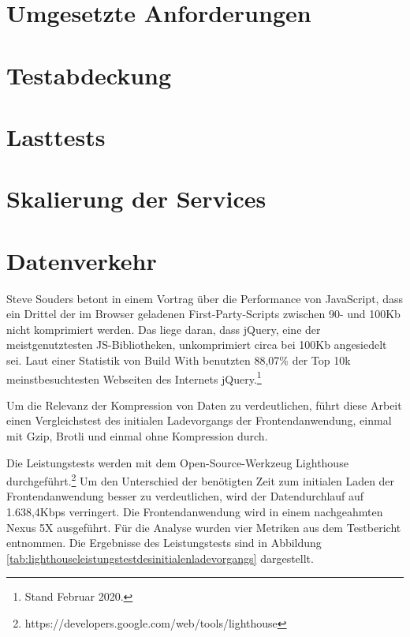 \section{Umgesetzte Anforderungen}
\label{sec:umgesetzteanforderungen}

\section{Testabdeckung}
\label{sec:testabdeckung}

\section{Lasttests}
\label{sec:lasttests}

\section{Skalierung der Services}
\label{sec:skalierungderservices}

\section{Datenverkehr}
\label{sec:uebertragung}

Steve Souders betont
in einem Vortrag über die Performance von JavaScript, dass ein Drittel der im Browser
geladenen First-Party-Scripts zwischen 90- und 100Kb nicht komprimiert werden.
Das liege daran, dass jQuery, eine der meistgenutztesten JS-Bibliotheken,
unkomprimiert circa bei 100Kb angesiedelt sei.\cite{SteveSoudersMakeJavaScriptFaster}
Laut einer Statistik von Build With benutzten 88,07\% der Top 10k meinstbesuchtesten
Webseiten des Internets jQuery.\footnote{Stand Februar 2020.\cite{BuildWithjQuery}}

Um die Relevanz der Kompression von Daten zu verdeutlichen, führt diese Arbeit einen
Vergleichstest des initialen Ladevorgangs der Frontendanwendung,
einmal mit Gzip, Brotli und einmal ohne Kompression durch.

Die Leistungstests
werden mit dem Open-Source-Werkzeug Lighthouse durchgeführt.\footnote{https://developers.google.com/web/tools/lighthouse}
Um den Unterschied der benötigten Zeit zum initialen Laden der Frontendanwendung
besser zu verdeutlichen, wird der Datendurchlauf auf 1.638,4Kbps verringert.
Die Frontendanwendung wird in einem nachgeahmten Nexus 5X ausgeführt.
Für die Analyse wurden vier Metriken aus dem Testbericht entnommen.
Die Ergebnisse des Leistungstests sind in Abbildung \ref{tab:lighthouseleistungstestdesinitialenladevorgangs}
dargestellt.

